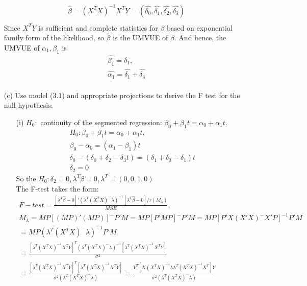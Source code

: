 \begin{itemize}
\[\begin{split}
    \hat{\beta} = (X^TX)^{-1}X^TY = (\hat{\delta_0}, \hat{\delta_1},\hat{\delta_2}, \hat{\delta_3})\\
    \end{split}
    \]   
    Since $X^TY$ is sufficient and complete statistics for $\beta$ based on exponential family form of the likelihood, so $\hat{\beta}$ is the UMVUE of $\beta$. And hence, the UMVUE of $\alpha_1, \beta_1$ is 
    \[ 
    \begin{split}
    \hat{\beta_1} = \hat{\delta_1},\\
    \hat{\alpha_1}=\hat{\delta_1}+ \hat{\delta_3}\\
    \end{split}
    \] 
    \item[(c)] Use model (3.1) and appropriate projections to derive the F test for the null hypothesis:\\
    \begin{itemize}
        \item [(i)] $H_0:$ continuity of the segmented regression: $\beta_0 + \beta_1 t = \alpha_0 + \alpha_1 t$. 
    \[ 
    \begin{split}
    H_0: \beta_0 + \beta_1 t = \alpha_0 + \alpha_1 t,\\
    \beta_0 - \alpha_0 = (\alpha_1 - \beta_1)t\\
    \delta_0 - (\delta_0 + \delta_2 - \delta_3t) = (\delta_1 + \delta_3- \delta_1)t\\
    \delta_2 = 0
    \end{split}
    \]    
    So the $H_0: \delta_2 = 0, \lambda^T \beta = 0, \lambda^T = (0,0,1,0)$\\
    The F-test takes the form:
    \[ 
    \begin{split}
    F-test = \frac{[\lambda^T\hat{\beta}-0]' (\lambda^T (X^TX)^{-} \lambda)^{-1} [\lambda^T\hat{\beta}-0]/r(M_{\lambda}) }{MSE},\\
    M_{\lambda} = MP [(MP)'(MP)]^{-} P'M= MP [P'MP]^{-} P'M= MP[P' X(X'X)^{-}X' P]^{-1} P'M\\
   = MP (\lambda^T (X^TX)^{-} \lambda)^{-1} P'M\\
    = \frac{[\lambda^T (X^TX)^{-1}X^TY]^T (\lambda^T (X^TX)^{-} \lambda)^{-1} [\lambda^T (X^TX)^{-1}X^TY]}{\sigma^2} \\
    = \frac{[\lambda^T (X^TX)^{-1}X^TY]^T [\lambda^T (X^TX)^{-1}X^TY]}{\sigma^2 (\lambda^T (X^TX)^{-} \lambda)} 
    = \frac{Y^T [X (X^TX)^{-1} \lambda \lambda^T (X^TX)^{-1}X^T]Y}{\sigma^2 (\lambda^T (X^TX)^{-} \lambda)} \\

\end{split}\]
\end{itemize}
\end{itemize}
